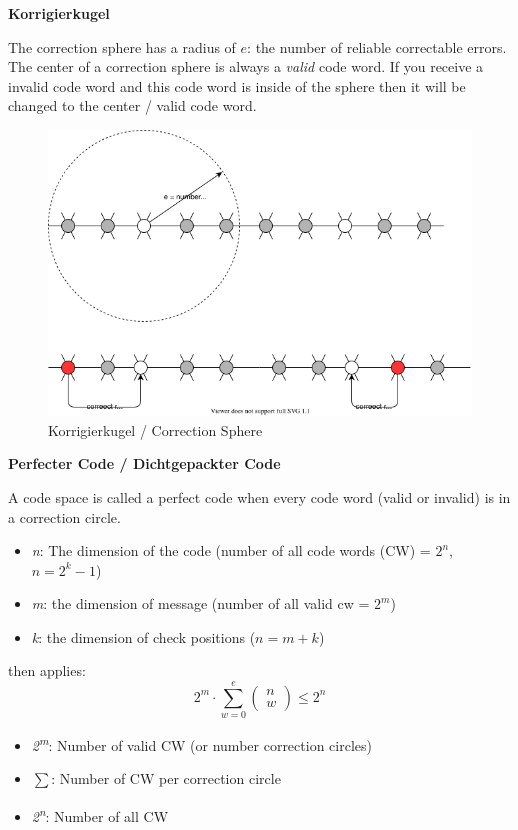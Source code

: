 \documentclass[11pt,twoside,twocolumn,landscape]{article}
\begin{document}
\textbf{Korrigierkugel}

The correction sphere has a radius of \(e\): the number of reliable correctable errors.
The center of a correction sphere is always a \emph{valid} code word.
If you receive a invalid code word and this code word is inside of the sphere then it will be changed to the center / valid code word.

\begin{figure}[htbp]
\centering
\includegraphics[width=.9\linewidth]{img/hamming_korrigierkugel.drawio.png}
\caption{\label{fig:org23eb051}Korrigierkugel / Correction Sphere}
\end{figure}

\textbf{Perfecter Code / Dichtgepackter Code}

A code space is called a perfect code when every code word (valid or invalid) is in a correction circle.

\begin{itemize}
\item \emph{n}: The dimension of the code (number of all code words (CW) = \(2^n\), \(n=2^k-1\))
\item \emph{m}: the dimension of message (number of all valid cw = \(2^m\))
\item \emph{k}: the dimension of check positions (\(n=m+k\))
\end{itemize}

then applies:
\begin{equation}
  2^m \cdot \sum_{w=0}^e \begin{pmatrix} n \\ w \end{pmatrix} \leq 2^n
\end{equation}

\begin{itemize}
\item \emph{2\textsuperscript{m}}: Number of valid CW (or number correction circles)
\item \emph{\(\sum\)}: Number of CW per correction circle
\item \emph{2\textsuperscript{n}}: Number of all CW
\end{itemize}
\end{document}
